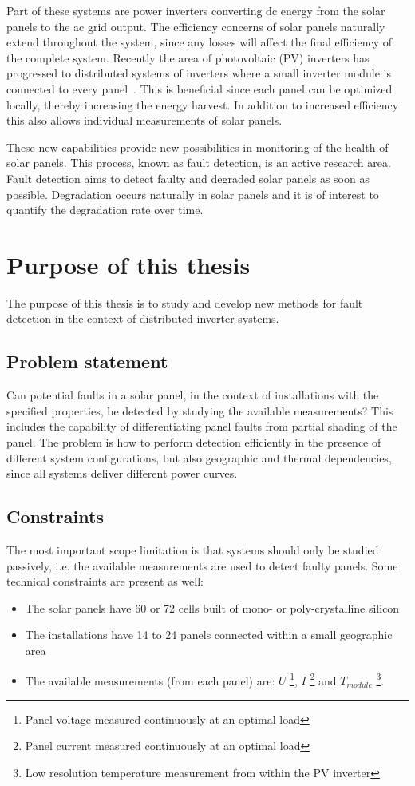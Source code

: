 Part of these systems are power inverters converting dc energy from the solar panels to the ac grid output.
The efficiency concerns of solar panels naturally extend throughout the system, since any losses will affect the final efficiency of the complete system.
Recently the area of photovoltaic (PV) inverters has progressed to distributed systems of inverters where a small inverter module is connected to every panel~\cite{Roman2006}.
This is beneficial since each panel can be optimized locally, thereby increasing the energy harvest.
In addition to increased efficiency this also allows individual measurements of solar panels.

These new capabilities provide new possibilities in monitoring of the health of solar panels.
This process, known as fault detection, is an active research area.
Fault detection aims to detect faulty and degraded solar panels as soon as possible. 
Degradation occurs naturally in solar panels and it is of interest to quantify the degradation rate over time.

\section{Purpose of this thesis}
The purpose of this thesis is to study and develop new methods for fault detection in the context of distributed inverter systems.

\subsection*{Problem statement}
Can potential faults in a solar panel, in the context of installations with the specified properties, be detected by studying the available measurements?
This includes the capability of differentiating panel faults from partial shading of the panel.
The problem is how to perform detection efficiently in the presence of different system configurations, but also geographic and thermal dependencies, since all systems deliver different power curves.

\newpage
\subsection*{Constraints}
The most important scope limitation is that systems should only be studied passively, i.e. the available measurements are used to detect faulty panels.  
Some technical constraints are present as well:
\begin{itemize}
\item The solar panels have 60 or 72 cells built of mono- or poly-crystalline silicon
\item The installations have 14 to 24 panels connected within a small geographic area
\item The available measurements (from each panel) are:
$U$ \footnote{Panel voltage measured continuously at an optimal load},
$I$ \footnote{Panel current measured continuously at an optimal load} and
$T_{module}$ \footnote{Low resolution temperature measurement from within the PV inverter}.

\end{itemize}

